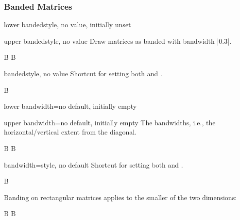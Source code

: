 \subsubsection{Banded Matrices}

\begin{docDmKey}[][docmulti]{lower banded}{}{style, no value, initially unset}
\end{docDmKey}
\begin{docDmKey}{upper banded}{}{style, no value}
    Draw matrices as banded with bandwidth |0.3|.
    \begin{dispExample}
        B
        B
    \end{dispExample}
\end{docDmKey}

\begin{docDmKey}{banded}{}{style, no value}
    Shortcut for setting both  and
    .
    \begin{dispExample}
        \drawmatrix[banded]B
    \end{dispExample}
\end{docDmKey}

\begin{docDmKey}[][docmulti]{lower bandwidth}{=}{no default, initially empty}
\end{docDmKey}
\begin{docDmKey}{upper bandwidth}{=}{no default, initially empty}
    The bandwidths, i.e., the horizontal/vertical extent from the diagonal.
    \begin{dispExample}
        \drawmatrix[lower bandwidth=.5]B
        \drawmatrix[upper bandwidth=.5]B
    \end{dispExample}
\end{docDmKey}
\begin{docDmKey}{bandwidth}{=}{style, no default}
    Shortcut for setting both  and
    .
    \begin{dispExample}
        \drawmatrix[bandwidth=.5]B
    \end{dispExample}
\end{docDmKey}

Banding on rectangular matrices applies to the smaller of the two dimensions:
\begin{dispExample}
    \drawmatrix[banded, width=.8]B
    \drawmatrix[upper banded, height=.7]B
\end{dispExample}

